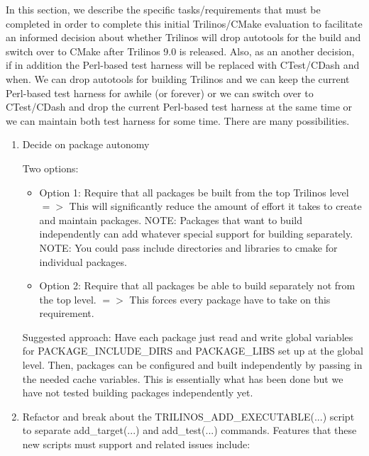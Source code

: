 \documentclass[pdf,ps2pdf,11pt]{SANDreport}
\begin{document}
In this section, we describe the specific tasks/requirements that must
be completed in order to complete this initial Trilinos/CMake
evaluation to facilitate an informed decision about whether Trilinos
will drop autotools for the build and switch over to CMake after
Trilinos 9.0 is released.  Also, as an another decision, if in
addition the Perl-based test harness will be replaced with CTest/CDash
and when.  We can drop autotools for building Trilinos and we can keep
the current Perl-based test harness for awhile (or forever) or we can
switch over to CTest/CDash and drop the current Perl-based test
harness at the same time or we can maintain both test harness for some
time.  There are many possibilities.

\begin{enumerate}

{}\item Decide on package autonomy

Two options:

  \begin{itemize}

  {}\item Option 1: Require that all packages be built from the top
  Trilinos level $=>$ This will significantly reduce the amount of
  effort it takes to create and maintain packages.  NOTE: Packages
  that want to build independently can add whatever special support for
  building separately.  NOTE: You could pass include directories and
  libraries to cmake for individual packages.

  {}\item Option 2: Require that all packages be able to build
  separately not from the top level. $=>$ This forces every package
  have to take on this requirement.

  \end{itemize}

Suggested approach: Have each package just read and write global
variables for PACKAGE\_INCLUDE\_DIRS and PACKAGE\_LIBS set up at the
global level.  Then, packages can be configured and built
independently by passing in the needed cache variables.  This is
essentially what has been done but we have not tested building
packages independently yet.

{}\item Refactor and break about the TRILINOS\_ADD\_EXECUTABLE(...) 
script to separate add\_target(...) and add\_test(...) commands.
Features that these new scripts must support and related issues
include:


\end{enumerate}
\end{document}
